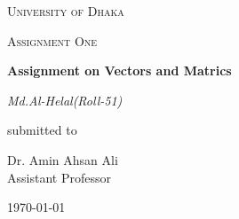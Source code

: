 \documentclass[12pt,a4paper]{report}
\begin{document}
\begin{titlepage}
\centering
{\scshape\LARGE University of Dhaka \par}
\vspace{1cm}
{\scshape\Large Assignment One\par}
\vspace{1.5cm}
{\huge\bfseries Assignment on Vectors and Matrics\par}
\vspace{2cm}
{\Large\itshape Md.Al-Helal(Roll-51)\par}
\vfill
submitted to\par
Dr. Amin Ahsan Ali \\ Assistant Professor
\vfill
{\large \today\par}
\end{titlepage}
\end{document}
